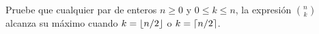 \begin{statement}{14}
  Pruebe que cualquier par de enteros $n \geq 0$ y $0 \leq k \leq n$, la expresi\'on
  $\binom{n}{k}$ alcanza su m\'aximo cuando $k = \left\lfloor n / 2 \right\rfloor$ o $k = \left\lceil n / 2 \right\rceil$.
\end{statement}